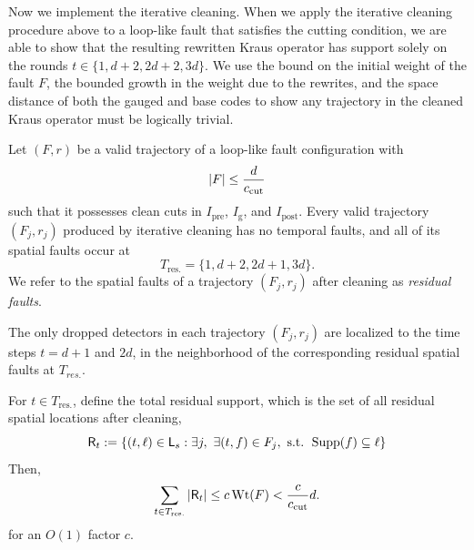 \documentclass[11pt]{article}
\begin{document}
Now we implement the iterative cleaning. When we apply the iterative cleaning procedure above to a loop-like fault that satisfies the cutting condition, we are able to show that the resulting rewritten Kraus operator has support solely on the rounds $t \in \{1, d+2, 2d+2, 3d\}$. We use the bound on the initial weight of the fault $F$, the bounded growth in the weight due to the rewrites, and the space distance of both the gauged and base codes to show any trajectory in the cleaned Kraus operator must be logically trivial. 


\begin{lemma}
\label{lem:cleaned-trajectory}
    Let $(F,r)$ be a valid trajectory of a loop-like fault configuration with 
    \[
    |F| \leq \frac{d}{c_{\rm cut}}
    \]
    such that it possesses clean cuts in $I_\mathrm{pre}$, $I_\mathrm{g}$, and $I_\mathrm{post}$.
    Every valid trajectory $(F_j,r_j)$ produced by iterative cleaning has no temporal faults, and all of its spatial faults occur at 
    \[
    T_\mathrm{res.} = \{1,d+2,2d+1,3d\}.
    \]
    We refer to the spatial faults of a trajectory $(F_j,r_j)$ after cleaning as \emph{residual faults}.
    
    The only dropped detectors in each trajectory $(F_j, r_j)$ are localized to the time steps $t = d+1$ and $2d$, in the neighborhood of the corresponding residual spatial faults at $T_{res.}$.

    For $t\in T_\mathrm{res.}$, define the total residual support, which is the set of all residual spatial locations after cleaning,
    \[
    \mathsf{R}_{t}:=\{(t,\ell)\in \mathsf{L}_s: \exists j,\ \exists (t,f)\in F_j, \text{ s.t. } \operatorname{Supp}(f)\subseteq \ell\}
    \]
    Then, 
    \begin{align}
    \label{eq:iter-bounded-fault}
        \sum_{t\in T_\mathrm{res.}}|\mathsf{R}_t|\le c\operatorname{Wt}(F)< \frac{c}{c_{\rm cut}}d.
    \end{align}
    for an $O(1)$ factor $c$.

\end{lemma}
\end{document}
